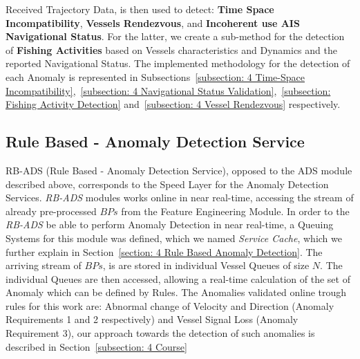 Received Trajectory Data, is then used to detect: \textbf{Time Space Incompatibility}, \textbf{Vessels Rendezvous}, and \textbf{Incoherent use AIS Navigational Status}. For the latter, we create a sub-method for the detection of \textbf{Fishing Activities} based on Vessels characteristics and Dynamics and the reported Navigational Status.
The implemented methodology for the detection of each Anomaly is represented in Subsections~\ref{subsection: 4 Time-Space Incompatibility},~\ref{subsection: 4 Navigational Status Validation},~\ref{subsection: Fishing Activity Detection} and~\ref{subsection: 4 Vessel Rendezvous} respectively.


\subsection{Rule Based - Anomaly Detection Service}
\label{subsection: 3 RB-ADS}
RB-ADS (Rule Based - Anomaly Detection Service), opposed to the ADS module described above, corresponds to the Speed Layer for the Anomaly Detection Services. \emph{RB-ADS} modules works online in near real-time, accessing the stream of already pre-processed $BPs$ from the Feature Engineering Module. In order to the \emph{RB-ADS} be able to perform Anomaly Detection in near real-time, a Queuing Systems for this module was defined, which we named \emph{Service Cache}, which we further explain in Section~\ref{section: 4 Rule Based Anomaly Detection}. The arriving stream of $BPs$, is are stored in individual Vessel Queues of size $N$. The individual Queues are then accessed, allowing a real-time calculation of the set of Anomaly which can be defined by Rules. The Anomalies validated online trough rules for this work are: Abnormal change of Velocity and Direction (Anomaly Requirements 1 and 2 respectively) and Vessel Signal Loss (Anomaly Requirement 3), our approach towards the detection of such anomalies is described in Section~\ref{subsection: 4 Course}  




